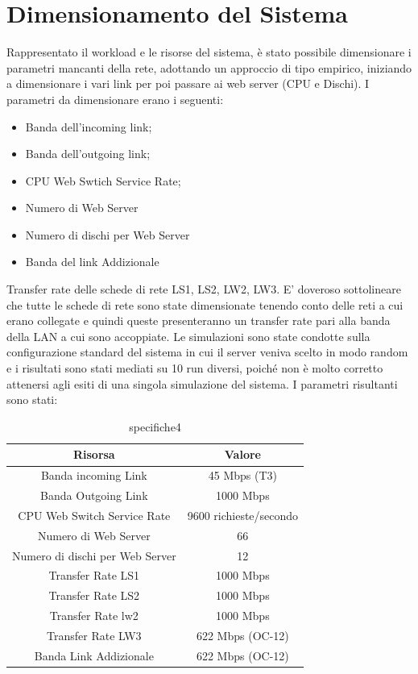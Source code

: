 \section{Dimensionamento del Sistema}
Rappresentato il workload e le risorse del sistema, è stato possibile dimensionare i parametri mancanti della rete, adottando un approccio di tipo empirico, iniziando a dimensionare i vari link per poi passare ai web server (CPU e Dischi). 
I parametri da dimensionare erano i seguenti:
\begin{itemize}
	\item Banda dell'incoming link;
	\item Banda dell'outgoing link;
	\item CPU Web Swtich Service Rate;
	\item Numero di Web Server
	\item Numero di dischi per Web Server
	\item Banda del link Addizionale
\end{itemize}
Transfer rate delle schede di rete LS1, LS2, LW2, LW3.
E' doveroso sottolineare che tutte le schede di rete sono state dimensionate tenendo conto delle reti a cui erano collegate e quindi queste presenteranno un transfer rate pari alla banda della LAN a cui sono accoppiate. Le simulazioni sono state condotte sulla configurazione standard del sistema in cui il server veniva scelto in modo random e  i risultati sono stati mediati su 10 run diversi, poiché non è molto corretto attenersi agli esiti di una singola simulazione del sistema. I parametri risultanti sono stati:
\begin{table}[H]
\begin{center}
\begin{tabular}{||c|c||}
\hline
Risorsa							&Valore\\
\hline
Banda incoming Link				&45 Mbps (T3)\\
\hline	
Banda Outgoing Link				&1000 Mbps\\
\hline
CPU Web Switch Service Rate		&9600 richieste/secondo\\
\hline
Numero di Web Server			&66\\
\hline
Numero di dischi per Web Server	&12\\
\hline
Transfer Rate LS1				&1000 Mbps\\
\hline
Transfer Rate LS2				&1000 Mbps\\
\hline
Transfer Rate lw2		&1000 Mbps\\
\hline
Transfer Rate LW3		&622 Mbps (OC-12)\\
\hline
Banda Link Addizionale	&622 Mbps (OC-12)\\
\hline
\end{tabular}
\end{center}
\caption{specifiche4}
\label{test_4}
\end{table}

